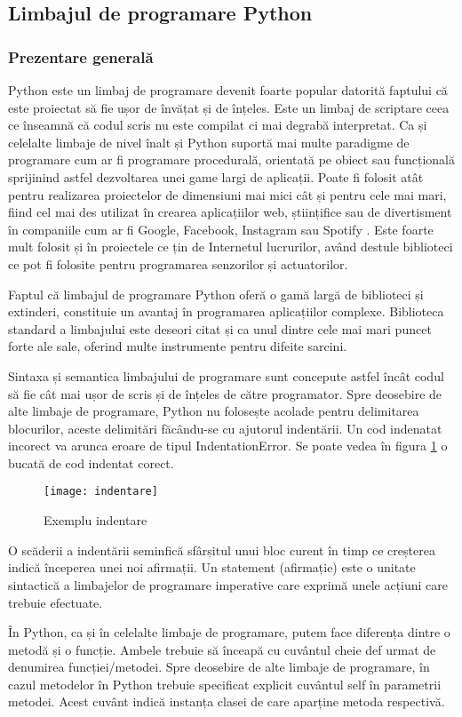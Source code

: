 \documentclass[../IoMusT.tex]{subfiles}
\begin{document}
\subsection{Limbajul de programare Python}
\subsubsection{Prezentare generală}
Python este un limbaj de programare devenit foarte popular datorită faptului că este proiectat să fie ușor de învățat și de înțeles. Este un limbaj de scriptare ceea ce înseamnă că codul scris nu este compilat ci mai degrabă interpretat. Ca și celelalte limbaje de nivel înalt și Python suportă mai multe paradigme de programare cum ar fi programare procedurală, orientată pe obiect sau funcțională sprijinind astfel dezvoltarea unei game largi de aplicații. Poate fi folosit atât pentru realizarea proiectelor de dimensiuni mai mici cât și pentru cele mai mari, fiind cel mai des utilizat în crearea aplicațiilor web, științifice sau de divertisment în companiile cum ar fi Google, Facebook, Instagram sau Spotify \cite{pythonWhere}. Este foarte mult folosit și în proiectele ce țin de Internetul lucrurilor, având destule biblioteci ce pot fi folosite pentru programarea senzorilor și actuatorilor.
\\
\par Faptul că limbajul de programare Python oferă o gamă largă de biblioteci și extinderi, constituie un avantaj în programarea aplicațiilor complexe. Biblioteca standard a limbajului este deseori citat și ca unul dintre cele mai mari puncet forte ale sale, oferind multe instrumente pentru difeite sarcini.
\\
\par Sintaxa și semantica limbajului de programare sunt concepute astfel încât codul să fie cât mai ușor de scris și de înțeles de către programator. Spre deosebire de alte limbaje de programare, Python nu folosește acolade pentru delimitarea blocurilor, aceste delimitări făcându-se cu ajutorul indentării. Un cod indenatat incorect va arunca eroare de tipul IndentationError. Se poate vedea în figura \ref{fig:indent} o bucată de cod indentat corect.
\begin{figure}[h]
\centering
\texttt{[image: indentare]}
\caption{Exemplu indentare}
\label{fig:indent}
\end{figure}
O scăderii  a indentării  seminfică sfârșitul unui bloc curent în timp ce creșterea indică începerea unei noi afirmații. Un statement (afirmație) este o unitate sintactică a limbajelor de programare imperative care exprimă  unele acțiuni care trebuie efectuate.
\\
\par În Python, ca și în celelalte limbaje de programare, putem face diferența dintre o metodă și o funcție. Ambele trebuie să înceapă cu cuvântul cheie def urmat de denumirea funcției/metodei. Spre deosebire de alte limbaje de programare, în cazul metodelor în Python trebuie specificat explicit cuvântul self în parametrii metodei. Acest cuvânt indică instanța clasei de care aparține metoda respectivă.
\end{document}
